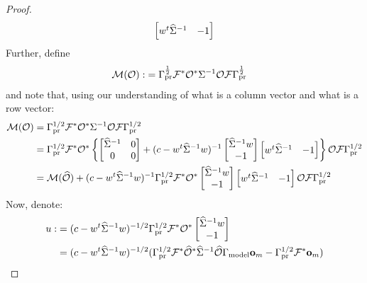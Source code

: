 \documentclass{amsart}
\numberwithin{equation}{section}
\begin{document}
\begin{proof}
\begin{align*}
    \begin{bmatrix}
      w^t \widehat{\Sigma}^{-1} & -1 
    \end{bmatrix}
  \end{align*}
  Further, define
  \begin{align*}
    \mathcal{M} (\mathcal{O} ):&= \Gamma_{\textup{pr}}^{\frac12}\mathcal{F}^* \mathcal{O}^* \Sigma^{-1} \mathcal{O} \mathcal{F}
    \Gamma_{\textup{pr}}^{\frac12}    
  \end{align*}
  and note that, using our understanding of what is a column vector and
  what is a row vector:
  \begin{align*}
    \mathcal{M}(\mathcal{O}) &= \Gamma_{\textup{pr}}^{1/2} \mathcal{F}^* \mathcal{O}^* \Sigma^{-1} \mathcal{O} \mathcal{F} \Gamma_{\textup{pr}}^{1/2} \\
    &= \Gamma_{\textup{pr}}^{1/2} \mathcal{F}^* \mathcal{O}^* \left \{
    \begin{bmatrix}
      \widehat{\Sigma}^{-1} & 0 \\
      0           & 0 
    \end{bmatrix}
    + (c -w^t \widehat{\Sigma}^{-1} w )^{-1}
    \begin{bmatrix}
      \widehat{\Sigma}^{-1} w \\
      -1
    \end{bmatrix}
    \begin{bmatrix}
      w^t \widehat{\Sigma}^{-1} & -1 
    \end{bmatrix} 
    \right \} \mathcal{O} \mathcal{F} \Gamma_{\textup{pr}}^{1/2} \\
    &= \mathcal{M} (\widehat{\mathcal{O}}) + (c -w^t \widehat{\Sigma}^{-1} w )^{-1}
    \Gamma_{\textup{pr}}^{1/2} \mathcal{F}^* \mathcal{O}^*
    \begin{bmatrix}
      \widehat{\Sigma}^{-1} w \\
      -1
    \end{bmatrix}
    \begin{bmatrix}
      w^t \widehat{\Sigma}^{-1} & -1 
    \end{bmatrix} 
    \mathcal{O} \mathcal{F} \Gamma_{\textup{pr}}^{1/2}
  \end{align*}
  Now, denote:
  \begin{align}\label{eq:u}
    \begin{split}
      u :&= (c -w^t \Sigmam^{-1} w )^{-1/2}
      \prcov^{1/2} \fwd^* \obs^* 
      \begin{bmatrix}
        \Sigmam^{-1} w \\
        -1 
      \end{bmatrix} \\
      & = (c -w^t \Sigmam^{-1} w )^{-1/2} ( \prcov^{1/2}\fwd^* \obsm^* \Sigmam^{-1} \obsm  \modcov \meas_m - \prcov^{1/2} \fwd^* \meas_m )\\

\end{split}
\end{align}
\end{proof}
\end{document}
